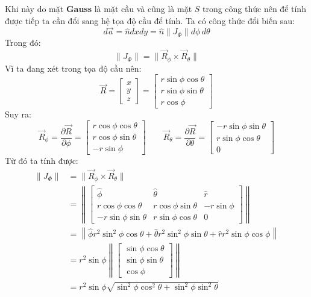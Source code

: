 \begin{enumerate}
Khi này do mặt \textbf{Gauss} là mặt cầu và cũng là mặt $S$ trong công thức nên để tính được tiếp ta cần đổi sang hệ tọa độ cầu để tính.
Ta có công thức đổi biến sau:
\[
d\vec{a} = \hat{n} dxdy = \hat{n} \lVert J_\Phi \rVert d\phi\,d\theta
\]
Trong đó:
\[
\lVert J_\Phi \rVert = \lVert \vec{R}_\phi \times \vec{R}_\theta \rVert
\]
Vì ta đang xét trong tọa độ cầu nên:
\[
\vec{R}
=
\begin{bmatrix}
x\\
y\\
z
\end{bmatrix}
=
\begin{bmatrix}
r\sin\phi\cos\theta\\
r\sin\phi\sin\theta\\
r\cos\phi
\end{bmatrix}
\]
Suy ra:
\[
\vec{R}_{\phi}
=
\frac{\partial \vec{R}}{\partial \phi}
=
\begin{bmatrix}
r\cos\phi\cos\theta\\
r\cos\phi\sin\theta\\
- r\sin\phi
\end{bmatrix}
\qquad
\vec{R}_{\theta}
=
\frac{\partial \vec{R}}{\partial \theta}
=
\begin{bmatrix}
- r\sin\phi\sin\theta\\
r\sin\phi\cos\theta\\
0
\end{bmatrix}
\]
Từ đó ta tính được:
\begin{align*}
\lVert J_\Phi \rVert
&= \lVert \vec{R}_\phi \times \vec{R}_\theta \rVert \\[6pt]
&=
\left\|
\begin{bmatrix}
\hat{\phi} & \hat{\theta} & \hat{r}\\
r\cos\phi\cos\theta & r\cos\phi\sin\theta & -r\sin\phi\\
-r\sin\phi\sin\theta & r\sin\phi\cos\theta & 0
\end{bmatrix}
\right\| \\[8pt]
&=
\left\|
\hat{\phi} r^2 \sin^2\phi \cos\theta
+
\hat{\theta} r^2 \sin^2\phi \sin\theta
+
\hat{r} r^2 \sin\phi \cos\phi
\right\| \\[8pt]
&=
r^2 \sin\phi
\left\|
\begin{bmatrix}
\sin\phi\cos\theta\\
\sin\phi\sin\theta\\
\cos\phi
\end{bmatrix}
\right\| \\[8pt]
&=
r^2 \sin\phi
\sqrt{
\sin^2\phi\cos^2\theta
+
\sin^2\phi\sin^2\theta
}
\end{align*}
\end{enumerate}
